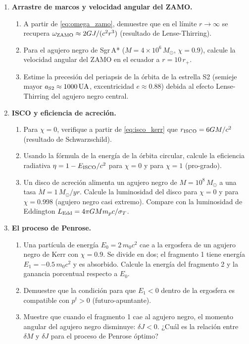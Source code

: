 \begin{enumerate}[leftmargin=2em, label=\textbf{P\thechapter.\arabic*.}]
  \item \textbf{Arrastre de marcos y velocidad angular del ZAMO.}
  \begin{enumerate}[label=(\alph*)]
    \item A partir de \eqref{eq:omega_zamo}, demuestre que en el límite $r \to \infty$ se recupera $\omega_{\rm ZAMO} \approx 2GJ/(c^2 r^3)$ (resultado de Lense-Thirring).
    \item Para el agujero negro de Sgr\,A* ($M = 4\times10^6\,M_\odot$, $\chi = 0.9$), calcule la velocidad angular del ZAMO en el ecuador a $r = 10\,r_+$.
    \item Estime la precesión del periapsis de la órbita de la estrella S2 (semieje mayor $a_{\rm S2} \approx 1000\,\si{UA}$, excentricidad $e \approx 0.88$) debida al efecto Lense-Thirring del agujero negro central.
  \end{enumerate}

  \item \textbf{ISCO y eficiencia de acreción.}
  \begin{enumerate}[label=(\alph*)]
    \item Para $\chi = 0$, verifique a partir de \eqref{eq:isco_kerr} que $r_{\rm ISCO} = 6GM/c^2$ (resultado de Schwarzschild).
    \item Usando la fórmula de la energía de la órbita circular, calcule la eficiencia radiativa $\eta = 1 - E_{\rm ISCO}/c^2$ para $\chi = 0$ y para $\chi = 1$ (pro-grado).
    \item Un disco de acreción alimenta un agujero negro de $M = 10^8\,M_\odot$ a una tasa $\dot{M} = 1\,M_\odot/\si{yr}$. Calcule la luminosidad del disco para $\chi = 0$ y para $\chi = 0.998$ (agujero negro casi extremo). Compare con la luminosidad de Eddington $L_{\rm Edd} = 4\pi GMm_p c/\sigma_T$.
  \end{enumerate}

  \item \textbf{El proceso de Penrose.}
  \begin{enumerate}[label=(\alph*)]
    \item Una partícula de energía $E_0 = 2\,m_0 c^2$ cae a la ergosfera de un agujero negro de Kerr con $\chi = 0.9$. Se divide en dos; el fragmento 1 tiene energía $E_1 = -0.5\,m_0 c^2$ y es absorbido. Calcule la energía del fragmento 2 y la ganancia porcentual respecto a $E_0$.
    \item Demuestre que la condición para que $E_1 < 0$ dentro de la ergosfera es compatible con $p^t > 0$ (futuro-apuntante).
    \item Muestre que cuando el fragmento 1 cae al agujero negro, el momento angular del agujero negro disminuye: $\delta J < 0$. ¿Cuál es la relación entre $\delta M$ y $\delta J$ para el proceso de Penrose óptimo?
  \end{enumerate}


\end{enumerate}
